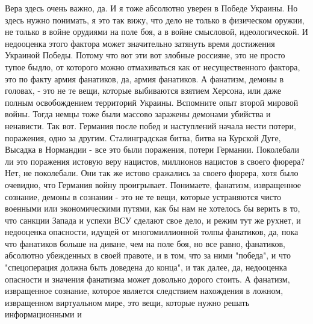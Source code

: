  
 
 
 
 



Вера здесь очень важно, да. И я тоже абсолютно уверен в Победе Украины. Но
здесь нужно понимать, я это так вижу, что дело не только в физическом оружии,
не только в войне орудиями на поле боя, а в войне смысловой, идеологической. И
недооценка этого фактора может значительно затянуть время достижения Украиной
Победы. Потому что вот эти вот злобные россияне, это не просто тупое быдло, от
которого можно отмахиваться как от несущественного фактора, это по факту армия
фанатиков, да, армия фанатиков. А фанатизм, демоны в головах, - это не те вещи,
которые выбиваются взятием Херсона, или даже полным освобождением территорий
Украины. Вспомните опыт второй мировой войны. Тогда немцы тоже были массово
заражены демонами убийства и ненависти. Так вот. Германия после побед и
наступлений начала нести потери, поражения, одно за другим. Сталинградская
битва, битва на Курской Дуге, Высадка в Нормандии - все это были поражения,
потери Германии. Поколебали ли это поражения истовую веру нацистов, миллионов
нацистов в своего фюрера? Нет, не поколебали. Они так же истово сражались за
своего фюрера, хотя было очевидно, что Германия войну проигрывает. Понимаете,
фанатизм, извращенное сознание, демоны в сознании - это не те вещи, которые
устраняются чисто военными или экономическими путями, как бы нам не хотелось бы
верить в то, что санкции Запада и успехи ВСУ сделают свое дело, и режим тут же
рухнет, и недооценка опасности, идущей от многомиллионной толпы фанатиков, да,
пока что фанатиков больше на диване, чем на поле боя, но все равно, фанатиков,
абсолютно убежденных в своей правоте, и в том, что за ними "победа", и что
"спецоперация должна быть доведена до конца", и так далее, да, недооценка
опасности и значения фанатизма может довольно дорого стоить. А фанатизм,
извращенное сознание, которое является следствием нахождения в ложном,
извращенном виртуальном мире, это вещи, которые нужно решать информационными и
